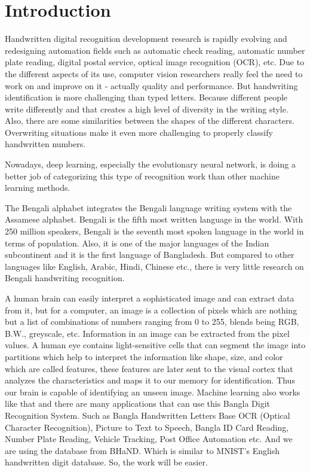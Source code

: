 \documentclass[conference]{IEEEtran}
\begin{document}
\section{Introduction}
Handwritten digital recognition development research is rapidly evolving and redesigning automation fields such as automatic check reading, automatic number plate reading, digital postal service, optical image recognition (OCR), etc. Due to the different aspects of its use, computer vision researchers really feel the need to work on and improve on it - actually quality and performance. But handwriting identification is more challenging than typed letters. Because different people write differently and that creates a high level of diversity in the writing style. Also, there are some similarities between the shapes of the different characters. Overwriting situations make it even more challenging to properly classify handwritten numbers. 

Nowadays, deep learning, especially the evolutionary neural network, is doing a better job of categorizing this type of recognition work than other machine learning methods. 

The Bengali alphabet integrates the Bengali language writing system with the Assamese alphabet. Bengali is the fifth most written language in the world. With 250 million speakers, Bengali is the seventh most spoken language in the world in terms of population. Also, it is one of the major languages of the Indian subcontinent and it is the first language of Bangladesh. But compared to other languages like English, Arabic, Hindi, Chinese etc., there is very little research on Bengali handwriting recognition. 

A human brain can easily interpret a sophisticated image and can extract data from it, but for a computer, an image is a collection of pixels which are nothing but a list of combinations of numbers ranging from 0 to 255, blends being RGB, B.W., greyscale, etc. Information in an image can be extracted from the pixel values. A human eye contains light-sensitive cells that can segment the image into partitions which help to interpret the information like shape, size, and color which are called features, these features are later sent to the visual cortex that analyzes the characteristics and maps it to our memory for identification. Thus our brain is capable of identifying an unseen image. Machine learning also works like that and there are many applications that can use this Bangla Digit Recognition System. Such as Bangla Handwritten Letters Base OCR (Optical Character Recognition), Picture to Text to Speech, Bangla ID Card Reading, Number Plate Reading, Vehicle Tracking, Post Office Automation etc. And we are using the database from BHaND. Which is similar to MNIST's English handwritten digit database. So, the work will be easier. 
\end{document}
